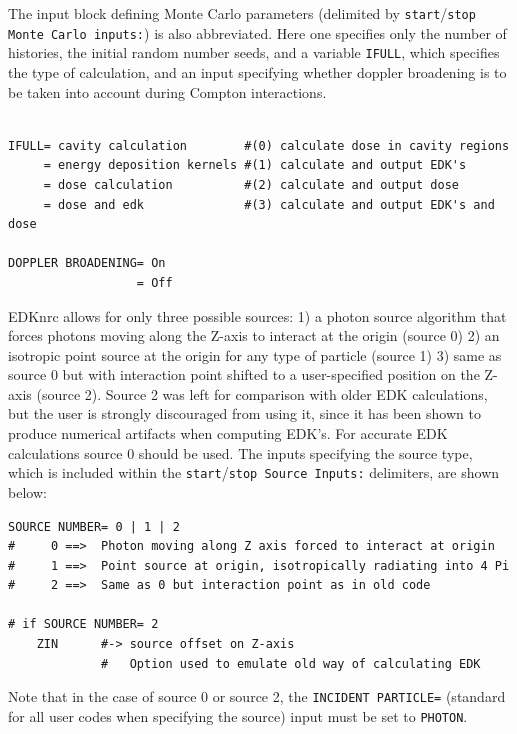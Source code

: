 \documentclass[12pt,twoside]{article}  %
\begin{document}
The input block defining Monte Carlo parameters (delimited by 
{\tt start}/{\tt stop Monte Carlo inputs:}) is also abbreviated.  Here
one specifies only the number of histories, the initial random number
seeds, and a variable {\tt IFULL}, which specifies the type of calculation,
and an input specifying whether doppler broadening is to be taken into
account during Compton interactions.

\begin{verbatim}

IFULL= cavity calculation        #(0) calculate dose in cavity regions
     = energy deposition kernels #(1) calculate and output EDK's
     = dose calculation          #(2) calculate and output dose
     = dose and edk              #(3) calculate and output EDK's and dose

DOPPLER BROADENING= On                 
                  = Off

\end{verbatim}

EDKnrc allows for only three possible sources: 1) a photon source algorithm
that forces photons moving along the Z-axis to interact at the origin 
(source 0) 2) 
an isotropic point source at the origin for any type of
particle (source 1) 3) same as source 0 but with interaction point shifted
to a user-specified position on the Z-axis (source 2).  Source 2 
was left for comparison with older EDK calculations, but the user
is strongly discouraged from using it, since it has been shown to produce
numerical artifacts when computing EDK's. For accurate EDK calculations
source 0 should be used.   The inputs specifying the source type, which is 
included within the {\tt start}/{\tt stop Source Inputs:} delimiters, 
are shown below: 

\begin{verbatim}
SOURCE NUMBER= 0 | 1 | 2
#     0 ==>  Photon moving along Z axis forced to interact at origin
#     1 ==>  Point source at origin, isotropically radiating into 4 Pi
#     2 ==>  Same as 0 but interaction point as in old code 

# if SOURCE NUMBER= 2
    ZIN      #-> source offset on Z-axis
             #   Option used to emulate old way of calculating EDK
\end{verbatim}

Note that in the case of source 0 or source 2, the {\tt INCIDENT PARTICLE=}
(standard for all user codes when specifying the source) input must be
set to {\tt PHOTON}.
\end{document}

